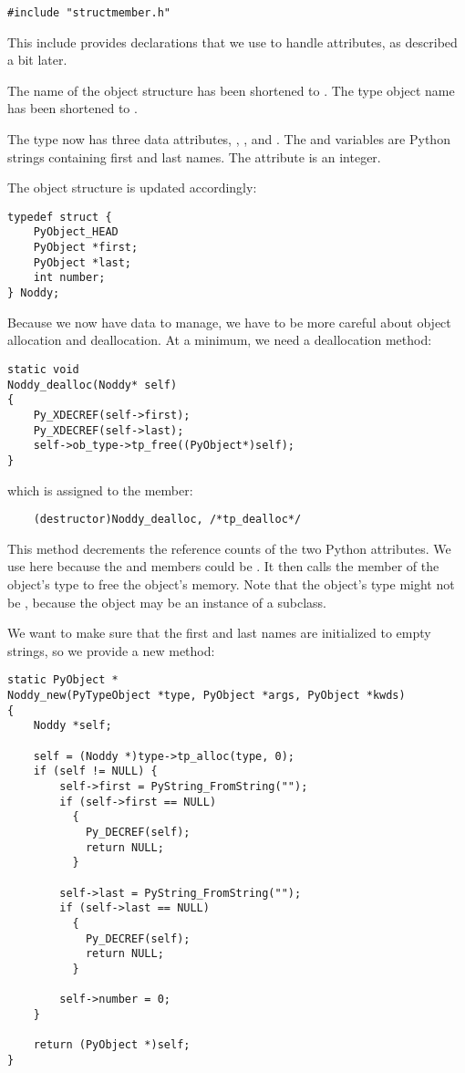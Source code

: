 \begin{verbatim}
#include "structmember.h"
\end{verbatim}

This include provides declarations that we use to handle attributes,
as described a bit later.

The name of the  object structure has been shortened to
.  The type object name has been shortened to
.

The   type now has three data attributes, ,
, and .  The  and 
variables are Python strings containing first and last names. The
 attribute is an integer.

The object structure is updated accordingly:

\begin{verbatim}
typedef struct {
    PyObject_HEAD
    PyObject *first;
    PyObject *last;
    int number;
} Noddy;
\end{verbatim}

Because we now have data to manage, we have to be more careful about
object allocation and deallocation.  At a minimum, we need a
deallocation method:

\begin{verbatim}
static void
Noddy_dealloc(Noddy* self)
{
    Py_XDECREF(self->first);
    Py_XDECREF(self->last);
    self->ob_type->tp_free((PyObject*)self);
}
\end{verbatim}

which is assigned to the  member:

\begin{verbatim}
    (destructor)Noddy_dealloc, /*tp_dealloc*/
\end{verbatim}

This method decrements the reference counts of the two Python
attributes. We use  here because the
 and  members could be \NULL.  It then
calls the  member of the object's type to free the
object's memory.  Note that the object's type might not be
, because the object may be an instance of a
subclass.

We want to make sure that the first and last names are initialized to
empty strings, so we provide a new method:

\begin{verbatim}
static PyObject *
Noddy_new(PyTypeObject *type, PyObject *args, PyObject *kwds)
{
    Noddy *self;

    self = (Noddy *)type->tp_alloc(type, 0);
    if (self != NULL) {
        self->first = PyString_FromString("");
        if (self->first == NULL)
          {
            Py_DECREF(self);
            return NULL;
          }
        
        self->last = PyString_FromString("");
        if (self->last == NULL)
          {
            Py_DECREF(self);
            return NULL;
          }

        self->number = 0;
    }

    return (PyObject *)self;
}
\end{verbatim}


